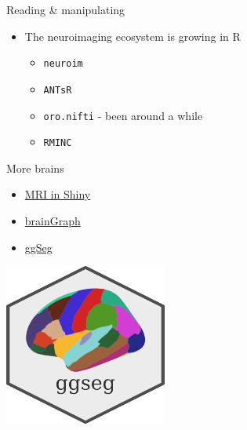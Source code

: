 \documentclass[
  ignorenonframetext,
]{beamer}
\providecommand{\tightlist}{%
  \setlength{\itemsep}{0pt}\setlength{\parskip}{0pt}}
\begin{document}
\begin{frame}[fragile]{Reading \& manipulating}
\protect\hypertarget{reading-manipulating}{}

\begin{itemize}
\tightlist
\item
  The neuroimaging ecosystem is growing in R

  \begin{itemize}
  \tightlist
  \item
    \texttt{neuroim}
  \item
    \texttt{ANTsR}
  \item
    \texttt{oro.nifti} - been around a while
  \item
    \texttt{RMINC}
  \end{itemize}
\end{itemize}

\end{frame}

\begin{frame}{More brains}
\protect\hypertarget{more-brains}{}

\begin{itemize}
\tightlist
\item
  \href{https://community.rstudio.com/t/shiny-contest-submission-shinymri-view-mri-images-in-shiny/23995}{MRI
  in Shiny}
\item
  \href{https://github.com/cwatson/brainGraph}{brainGraph}
\item
  \href{https://github.com/LCBC-UiO/ggseg}{ggSeg}
\end{itemize}

\includegraphics[width=0.4\textwidth,height=\textheight]{../external/images/ggseglogo.png}

\end{frame}
\end{document}

